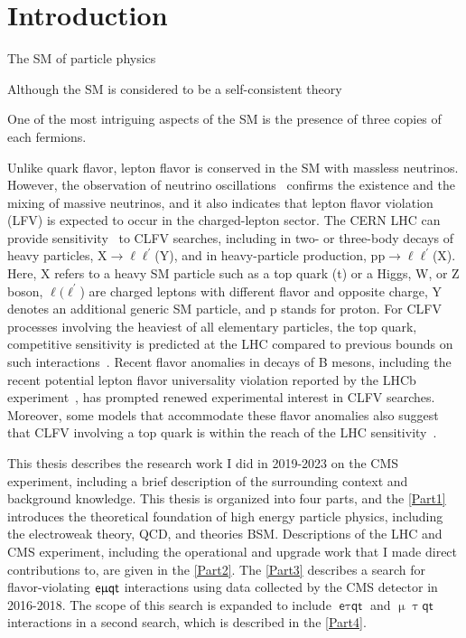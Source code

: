 \chapter{Introduction}
\label{chap:Introduction}

The \ac{SM} of particle physics 

Although the \ac{SM} is considered to be a self-consistent theory

One of the most intriguing aspects of the \ac{SM} is the presence of three copies of each fermions.  

Unlike quark flavor, lepton flavor is conserved in the \ac{SM} with massless neutrinos. However, the observation of neutrino oscillations~\cite{Super-Kamiokande:1998kpq,SNO:2002tuh} confirms the existence and the mixing of massive neutrinos, and it also indicates that lepton flavor violation (LFV) is expected to occur in the charged-lepton sector. The \ac{CERN} \ac{LHC} can provide sensitivity~\cite{Davidson:2012wn} to \ac{CLFV} searches, including in two- or three-body decays of heavy particles, X$\rightarrow\ell\ell^{\prime}$(Y), and in heavy-particle production, pp$ \rightarrow\ell\ell^{\prime}$(X). Here, X refers to a heavy \ac{SM} particle such as a top quark (t) or a Higgs, W, or Z boson, $\ell(\ell^{\prime}$) are charged leptons with different flavor and opposite charge, Y denotes an additional generic \ac{SM} particle, and p stands for proton. For \ac{CLFV} processes involving the heaviest of all elementary particles, the top quark, competitive sensitivity is predicted at the \ac{LHC} compared to previous bounds on such interactions~\cite{Davidson:2015zza}. Recent flavor anomalies in decays of B mesons, including the recent potential lepton flavor universality violation reported by the \ac{LHCb} experiment~\cite{LHCb:2023zxo}, has prompted renewed experimental interest in \ac{CLFV} searches. Moreover, some models that accommodate these flavor anomalies also suggest that \ac{CLFV} involving a top quark is within the reach of the \ac{LHC} sensitivity~\cite{Kim:2018oih}.

This thesis describes the research work I did in 2019-2023 on the \ac{CMS} experiment, including a brief description of the surrounding context and background knowledge. This thesis is organized into four parts, and the \autoref{Part1} introduces the theoretical foundation of high energy particle physics, including the electroweak theory, \ac{QCD}, and theories \ac{BSM}. Descriptions of the \ac{LHC} and {CMS} experiment, including the operational and upgrade work that I made direct contributions to, are given in the \autoref{Part2}. The \autoref{Part3} describes a search for flavor-violating $\textsf{e}\upmu\textsf{{q}t}$ interactions using data collected by the \ac{CMS} detector in 2016-2018. The scope of this search is expanded to include $\textsf{e}\uptau\textsf{qt}$ and $\upmu\uptau\textsf{qt}$ interactions in a second search, which is described in the \autoref{Part4}.




